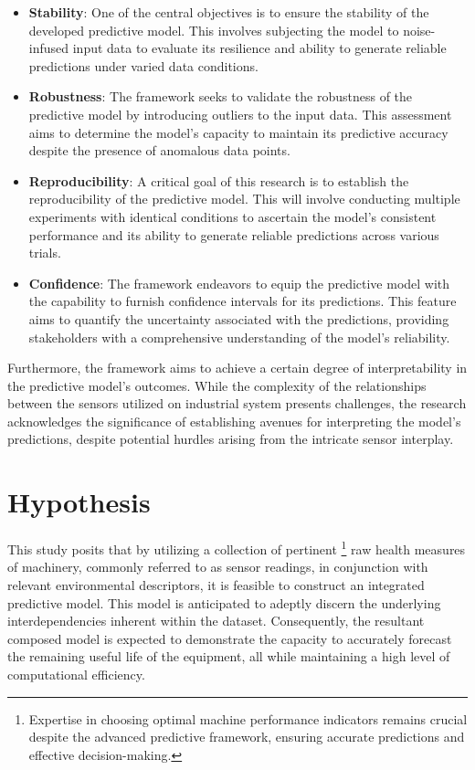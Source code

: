 \documentclass{IEEEtran}
\begin{document}
        \begin{itemize}
            \item \textbf{Stability}: One of the central objectives is to ensure the stability of the developed predictive model. This involves subjecting the model to noise-infused input data to evaluate its resilience and ability to generate reliable predictions under varied data conditions.
            \item \textbf{Robustness}: The framework seeks to validate the robustness of the predictive model by introducing outliers to the input data. This assessment aims to determine the model's capacity to maintain its predictive accuracy despite the presence of anomalous data points.
            \item \textbf{Reproducibility}: A critical goal of this research is to establish the reproducibility of the predictive model. This will involve conducting multiple experiments with identical conditions to ascertain the model's consistent performance and its ability to generate reliable predictions across various trials.
            \item \textbf{Confidence}: The framework endeavors to equip the predictive model with the capability to furnish confidence intervals for its predictions. This feature aims to quantify the uncertainty associated with the predictions, providing stakeholders with a comprehensive understanding of the model's reliability.
        \end{itemize}

        Furthermore, the framework aims to achieve a certain degree of interpretability in the predictive model's outcomes. While the complexity of the relationships between the sensors utilized on industrial system presents challenges, the research acknowledges the significance of establishing avenues for interpreting the model's predictions, despite potential hurdles arising from the intricate sensor interplay.

    \section{Hypothesis}

        This study posits that by utilizing a collection of pertinent \footnote{Expertise in choosing optimal machine performance indicators remains crucial despite the advanced predictive framework, ensuring accurate predictions and effective decision-making.} raw health measures of machinery, commonly referred to as sensor readings, in conjunction with relevant environmental descriptors, it is feasible to construct an integrated predictive model. This model is anticipated to adeptly discern the underlying interdependencies inherent within the dataset. Consequently, the resultant composed model is expected to demonstrate the capacity to accurately forecast the remaining useful life of the equipment, all while maintaining a high level of computational efficiency.
\end{document}
